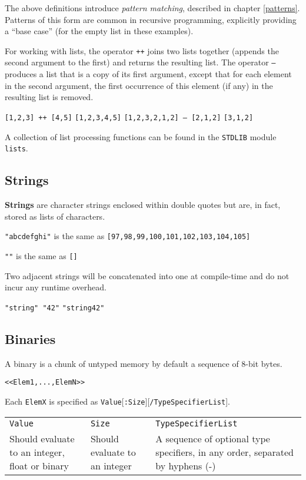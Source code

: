 The above definitions introduce \textit{pattern matching}, described in chapter \ref{patterns}.  Patterns of this form are common in recursive programming,
explicitly providing a ``base case'' (for the empty list in these examples).

For working with lists, the operator \texttt{++} joins two lists together (appends the second argument to the first) and
returns the resulting list.  The operator \texttt{--} produces a list that
is a copy of its first argument, except that for each element in
the second argument, the first occurrence of this element (if any) in the resulting list is
removed.

\texttt{[1,2,3] ++ [4,5]} \resultingin \texttt{[1,2,3,4,5]}
\texttt{[1,2,3,2,1,2] -- [2,1,2]} \resultingin \texttt{[3,1,2]}

A collection of list processing functions can be found in the
\texttt{STDLIB} module \texttt{lists}.


\subsection{Strings}
\label{datatypes:string}
\textbf{Strings} are character strings enclosed within double quotes
but are, in fact, stored as lists of characters.

\texttt{"abcdefghi"} is the same as \texttt{[97,98,99,100,101,102,103,104,105]}

\texttt{""} is the same as \texttt{[]}

Two adjacent strings will be concatenated into one at compile-time and
do not incur any runtime overhead.

\texttt{"string" "42"} \resultingin \texttt{"string42"}


\subsection{Binaries}
\label{datatypes:binary}
A binary is a chunk of untyped memory by default a sequence of 8-bit
bytes.

\texttt{<}\texttt{<Elem1,...,ElemN>}\texttt{>}

Each \texttt{ElemX} is specified as \texttt{Value}[\texttt{:Size}][\texttt{/TypeSpecifierList}].

\begin{center}
\begin{tabular}{|>{\raggedright}p{73pt}|>{\raggedright}p{81pt}|>{\raggedright}p{147pt}|}
\hline
\multicolumn{3}{|p{297pt}|}{Element specification}\tabularnewline
\hline
\texttt{Value} & \texttt{Size} & \texttt{TypeSpecifierList}\tabularnewline
\hline
Should evaluate to an integer, float or binary & Should
evaluate to an integer & A sequence of optional type specifiers, in any order,
separated by hyphens (-)\tabularnewline
\hline
\end{tabular}
\end{center}

